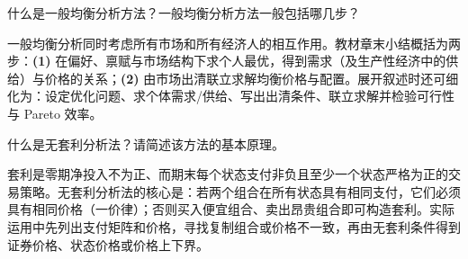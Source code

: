 \begin{problem}
 什么是一般均衡分析方法？一般均衡分析方法一般包括哪几步？
\end{problem}
\begin{solution}
一般均衡分析同时考虑所有市场和所有经济人的相互作用。教材章末小结概括为两步：\textbf{(1)} 在偏好、禀赋与市场结构下求个人最优，得到需求（及生产性经济中的供给）与价格的关系；\textbf{(2)} 由市场出清联立求解均衡价格与配置。展开叙述时还可细化为：设定优化问题、求个体需求/供给、写出出清条件、联立求解并检验可行性与 Pareto 效率。
\end{solution}

\begin{problem}
 什么是无套利分析法？请简述该方法的基本原理。
\end{problem}
\begin{solution}
套利是零期净投入不为正、而期末每个状态支付非负且至少一个状态严格为正的交易策略。无套利分析法的核心是：若两个组合在所有状态具有相同支付，它们必须具有相同价格（一价律）；否则买入便宜组合、卖出昂贵组合即可构造套利。实际运用中先列出支付矩阵和价格，寻找复制组合或价格不一致，再由无套利条件得到证券价格、状态价格或价格上下界。
\end{solution}
